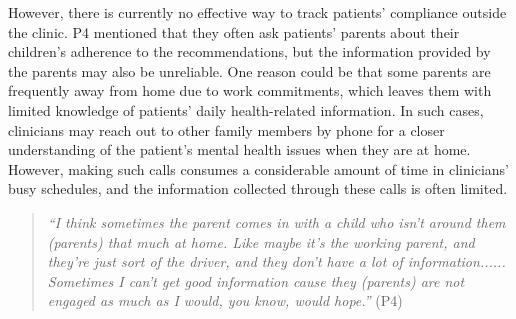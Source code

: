 However, there is currently no effective way to track patients' compliance outside the clinic. 
P4 mentioned that they often ask patients' parents about their children's adherence to the recommendations, but the information provided by the parents may also be unreliable.
One reason could be that some parents are frequently away from home due to work commitments, which leaves them with limited knowledge of patients’ daily health-related information. 
In such cases, clinicians may reach out to other family members by phone for a closer understanding of the patient’s mental health issues when they are at home. 
However, making such calls consumes a considerable amount of time in clinicians' busy schedules, and the information collected through these calls is often limited. 
\begin{quote}
    \textit{``I think sometimes the parent comes in with a child who isn't around them (parents) that much at home. Like maybe it's the working parent, and they're just sort of the driver, and they don't have a lot of information...... Sometimes I can't get good information cause they (parents) are not engaged as much as I would, you know, would hope.''} (P4)
\end{quote}


